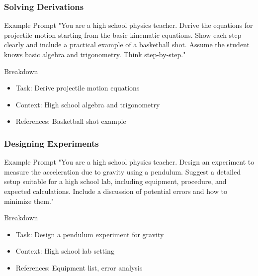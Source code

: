 \documentclass{beamer}
\begin{document}
\begin{frame}
\frametitle{Solving Derivations}
\begin{exampleblock}{Example Prompt}
"You are a high school physics teacher. Derive the equations for projectile motion starting from the basic kinematic equations. Show each step clearly and include a practical example of a basketball shot. Assume the student knows basic algebra and trigonometry. Think step-by-step."
\end{exampleblock}

\begin{alertblock}{Breakdown}
\begin{itemize}
\item Task: Derive projectile motion equations
\item Context: High school algebra and trigonometry
\item References: Basketball shot example
\end{itemize}
\end{alertblock}
\end{frame}

\begin{frame}
\frametitle{Designing Experiments}
\begin{exampleblock}{Example Prompt}
"You are a high school physics teacher. Design an experiment to measure the acceleration due to gravity using a pendulum. Suggest a detailed setup suitable for a high school lab, including equipment, procedure, and expected calculations. Include a discussion of potential errors and how to minimize them."
\end{exampleblock}

\begin{alertblock}{Breakdown}
\begin{itemize}
\item Task: Design a pendulum experiment for gravity
\item Context: High school lab setting
\item References: Equipment list, error analysis
\end{itemize}
\end{alertblock}
\end{frame}
\end{document}
